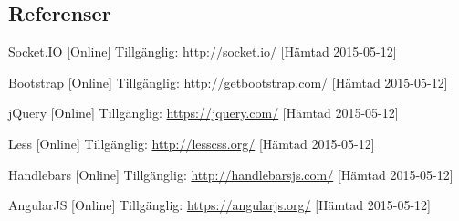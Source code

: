 \subsection{Referenser}
\vspace{-15mm}
\renewcommand{\refname}{}
\begin{thebibliography}{9}

Socket.IO [Online] Tillgänglig: 
\url{http://socket.io/} [Hämtad 2015-05-12]

Bootstrap [Online] Tillgänglig: 
\url{http://getbootstrap.com/} [Hämtad 2015-05-12]

jQuery [Online] Tillgänglig: 
\url{https://jquery.com/} [Hämtad 2015-05-12]

Less [Online] Tillgänglig: 
\url{http://lesscss.org/} [Hämtad 2015-05-12]

Handlebars [Online] Tillgänglig: 
\url{http://handlebarsjs.com/} [Hämtad 2015-05-12]

AngularJS [Online] Tillgänglig: 
\url{https://angularjs.org/} [Hämtad 2015-05-12]

\end{thebibliography}
